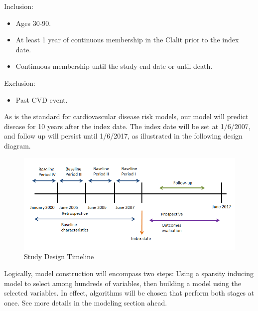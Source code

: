 \documentclass[a4paper,12pt]{article}
\begin{document}
		Inclusion:
		\begin{itemize}
			\item Ages 30-90.
			\item At least 1 year of continuous membership in the Clalit prior to the index date.
			\item Continuous membership until the study end date or until death.
		\end{itemize}
		Exclusion:
		\begin{itemize}
			\item Past CVD event.
		\end{itemize}
		
		As is the standard for cardiovascular disease risk models, our model will predict disease for 10 years after the index date. The index date will be set at 1/6/2007, and follow up will persist until 1/6/2017, as illustrated in the following design diagram.
		
		\begin{figure}[h]
			\centering
			\includegraphics[width=\textwidth]{prelim-results/Panpredictor/timeline.png}
			\caption{Study Design Timeline}
		\end{figure}
		
		Logically, model construction will encompass two steps: Using a sparsity inducing model to select among hundreds of variables, then building a model using the selected variables. In effect, algorithms will be chosen that perform both stages at once. See more details in the modeling section ahead.
		
\end{document}
